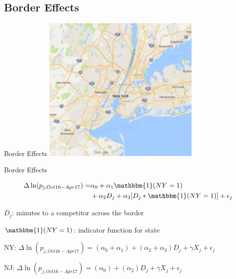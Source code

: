 \documentclass[xcolor=table]{beamer}
\begin{document}
\begin{spacing}{1.2}
%


\section{Border Effects}

\begin{frame}{Border Effects}
\centering
\includegraphics[width=3in]{nynj_map_google.jpg}

\end{frame}

\begin{frame}{Border Effects}

$$
\begin{aligned}
\Delta \ln (p_{j,Oct16-Apr17})  = & \alpha_0 + \alpha_1  \mathbbm{1}(NY=1)  \\
& + \alpha_2 D_{j} + \alpha_3[D_j * \mathbbm{1}(NY=1)] + \epsilon_{j} 
\end{aligned}
$$

$D_j$: minutes to a competitor across the border

$\mathbbm{1}(NY=1)$: indicator function for state

\bigskip

\begin{centering}

NY: $
\Delta \ln (p_{j,Oct16-Apr17})  = (\alpha_0 +\alpha_1) +  (\alpha_2 + \alpha_3) D_j +\gamma X_{j}  + \epsilon_{j}   
$

\bigskip

NJ:
$
\Delta \ln (p_{j,Oct16-Apr17})  = (\alpha_0 ) +  (\alpha_2 ) D_j +\gamma X_{j}  + \epsilon_{j}   
$

\end{centering}
\end{frame}


\end{spacing}
\end{document}
